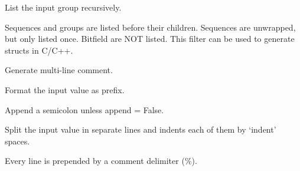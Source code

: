 \documentclass[letterpaper,10pt,english]{sphinxmanual}
\begin{document}

\begin{fulllineitems}
\label{\detokenize{developer:wuppercodegen.filter.list_sequences}}
List the input group recursively.

Sequences and groups are listed before their children. Sequences are unwrapped, but only
listed once. Bitfield are NOT listed. This filter can be used to generate structs in C/C++.

\end{fulllineitems}


\begin{fulllineitems}
\label{\detokenize{developer:wuppercodegen.filter.multi_line_comment}}
Generate multi-line comment.

\end{fulllineitems}


\begin{fulllineitems}
\label{\detokenize{developer:wuppercodegen.filter.prepend}}
Format the input value as prefix.

\end{fulllineitems}


\begin{fulllineitems}
\label{\detokenize{developer:wuppercodegen.filter.semi}}
Append a semicolon unless append = False.

\end{fulllineitems}


\begin{fulllineitems}
\label{\detokenize{developer:wuppercodegen.filter.tex_comment}}
Split the input value in separate lines and indents each of them by `indent' spaces.

Every line is prepended by a comment delimiter (\%).

\end{fulllineitems}
\end{document}
